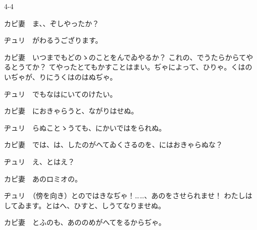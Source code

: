 \documentclass[tate,paper=b6j,jafontsize=9pt]{jlreq}
\begin{document}
\begin{azconvIndented}{4\zw}{-4\zw}

カピ妻　ま、、ぞしやったか？

ヂュリ　がわるうござります。

カピ妻　いつまでもどのゝのことをんでゐやるか？ これの、でうたらからてやるとうてか？ てやったとてもかすことはまい。ぢゃによって、ひりゃ。くはのいぢゃが、りにうくはのはぬぢゃ。

ヂュリ　でもなはにいてのけたい。

カピ妻　におきゃらうと、ながりはせぬ。

ヂュリ　らぬことゝうても、にかいではをられぬ。

カピ妻　では、は、したのがへてゐくさるのを、にはおきゃらぬな？

ヂュリ　え、とはえ？

カピ妻　あのロミオの。

ヂュリ　（傍を向き）とのではきなぢゃ！……、あのをさせられませ！ わたしはしてゐます。とはへ、ひすと、しうてなりませぬ。

カピ妻　とふのも、あののめがへてをるからぢゃ。


\end{azconvIndented}
\end{document}
